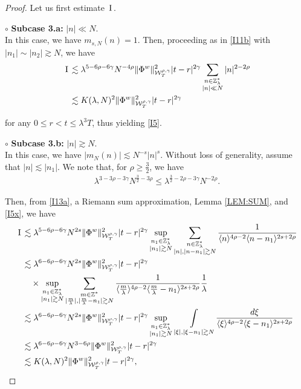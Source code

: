 \documentclass[letterpaper, 11pt,  reqno]{amsart}
\DeclareMathOperator*{\intt}{\int}
\newcommand{\1}{\hspace{0.5mm}\text{I}\hspace{0.5mm}}
\newcommand{\noi}{\noindent}
\newcommand{\Z}{\mathbb{Z}}
\newcommand{\g}{\gamma}
\newcommand{\ld}{\lambda}
\newcommand{\les}{\lesssim}
\newcommand{\ges}{\gtrsim}
\newcommand{\jb}[1]
{\langle #1 \rangle}
\newcommand{\W}{\mathcal{W}}
\numberwithin{equation}{section}
\numberwithin{theorem}{section}
\begin{document}
\begin{proof}
Let us first estimate $\1$.




\noi
$\circ$ {\bf Subcase 3.a:}  $|n| \ll N$.\\
\indent
In this case, we have $m_{s, N}(n) = 1$.
Then, proceeding as in \eqref{I11b} with $|n_1|\sim |n_2|\ges N$, we have 
\begin{align}
\begin{split}
\1
&\les 
\ld^{5-6\rho -6\g}N^{-4\rho }
\| \Phi^{w} \|^2_{\W_{T}^{\rho, \g}} 
|t-r|^{2\g} 
\sum_{\substack{n \in \Z_\ld^*\\|n|\ll N}} |n|^{2-2\rho} \\
 &\les 
K(\ld, N)^2
 \| \Phi^{w} \|^2_{\W_{T}^{\rho, \g}}  
|t-r|^{2\g}
\end{split}
\label{I14}
\end{align}




 \noi
for any $0\leq r<t\leq \ld^3T$, 
thus yielding \eqref{I5}.


\medskip


\noi
$\circ$ {\bf Subcase 3.b:}  $|n| \ges N$.\\
\indent
In this case, we have   $|m_N(n)| \les  N^{-s} |n|^{s}$.
Without loss of generality, assume that $|n|\les |n_1|$.
We note that, for $\rho \ge \frac 32$, we have 
\begin{align}
\ld^{3- 3\rho-3\g} N^{\frac 32 - 3\rho}
\le
\ld^{ \frac 32 - 2\rho - 3\g} N^{-2\rho}.
\label{I5x}
\end{align}

\noi
Then, from \eqref{I13a}, a Riemann sum approximation, 
Lemma \ref{LEM:SUM}, 
and 
\eqref{I5x}, we have
\begin{align}
\1
&\les 
\ld^{5-6\rho -6\g}N^{2s }
\| \Phi^{w} \|^2_{\W_{T}^{\rho, \g}} 
|t-r|^{2\g}
\sup_{\substack{n_1 \in \Z_\ld^*\\|n_1|\ges N} }
\sum_{\substack{n \in \Z_\ld^*\\|n|, |n- n_1|\ges N}} 
\frac{1}{\jb{n}^{4\rho - 2}\jb{n - n_1}^{2s+2\rho}}
\notag \\
&\les 
\ld^{6-6\rho -6\g}N^{2s }
\| \Phi^{w} \|^2_{\W_{T}^{\rho, \g}} 
|t-r|^{2\g}  \notag \\
& \quad 
\times 
\sup_{\substack{n_1 \in \Z_\ld^*\\|n_1|\ges N} }
 \sum_{\substack{m \in \Z^*\\ |\frac m\ld |, |\frac m\ld - n_1|\ges  N}} 
\frac{1}{\jb{\frac{m}{\ld}}^{4\rho - 2}
\jb{ \frac m\ld - n_1}^{2s + 2\rho}}
 \frac 1\ld
\label{I16x}\\
&\les 
\ld^{6-6\rho -6\g}N^{2s }
\| \Phi^{w} \|^2_{\W_{T}^{\rho, \g}} 
|t-r|^{2\g}
\sup_{\substack{n_1 \in \Z_\ld^*\\|n_1|\ges N} }
\intt_{|\xi|, |\xi - n_1|\ges N} 
\frac{d\xi}{\jb{\xi}^{4\rho - 2}
\jb{ \xi - n_1}^{2s + 2\rho}} \notag \\
 &\les 
\ld^{6-6\rho -6\g}N^{3-6\rho }
 \| \Phi^{w} \|^2_{\W_{T}^{\rho, \g}}  
|t-r|^{2\g} \notag \\
 &\les 
K(\ld, N)^2
 \| \Phi^{w} \|^2_{\W_{T}^{\rho, \g}}  
|t-r|^{2\g}, \notag 
\end{align}


\end{proof}
\end{document}
